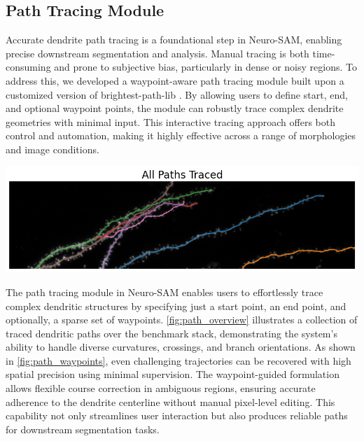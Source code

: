 \subsection{Path Tracing Module}
Accurate dendrite path tracing is a foundational step in Neuro-\gls{SAM}, enabling precise downstream segmentation and analysis. Manual tracing is both time-consuming and prone to subjective bias, particularly in dense or noisy regions. To address this, we developed a waypoint-aware path tracing module built upon a customized version of brightest-path-lib \cite{Jha_2023}. By allowing users to define start, end, and optional waypoint points, the module can robustly trace complex dendrite geometries with minimal input. This interactive tracing approach offers both control and automation, making it highly effective across a range of morphologies and image conditions.

\begin{center}
\includegraphics[width=1.0\textwidth]{figures/30_path_overview.png}
\label{fig:path_overview}
\end{center}

The path tracing module in Neuro-\gls{SAM} enables users to effortlessly trace complex dendritic structures by specifying just a start point, an end point, and optionally, a sparse set of waypoints. \autoref{fig:path_overview} illustrates a collection of traced dendritic paths over the benchmark stack, demonstrating the system's ability to handle diverse curvatures, crossings, and branch orientations. As shown in \autoref{fig:path_waypoints}, even challenging trajectories can be recovered with high spatial precision using minimal supervision. The waypoint-guided formulation allows flexible course correction in ambiguous regions, ensuring accurate adherence to the dendrite centerline without manual pixel-level editing. This capability not only streamlines user interaction but also produces reliable paths for downstream segmentation tasks.

